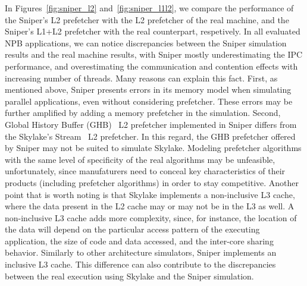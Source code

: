 \documentclass[AMA,final,STIX1COL]{WileyNJD-v2}
\begin{document}
In Figures~\ref{fig:sniper_l2} and~\ref{fig:sniper_l1l2}, we compare the performance of the Sniper's L2 prefetcher with the L2 prefetcher of the real machine, and the Sniper's L1+L2 prefetcher with the real counterpart, respetively.
In all evaluated NPB applications, we can notice discrepancies between the Sniper simulation results and the real machine results, with Sniper mostly underestimating the IPC performance, and overestimating the communication and contention effects with increasing number of threads.
Many reasons can explain this fact. 
First, as mentioned above, Sniper presents errors in its memory model when simulating parallel applications, even without considering prefetcher. 
These errors may be further amplified by adding a memory prefetcher in the simulation. 
Second, Global History Buffer (GHB)~\cite{nesbit2004data} L2 prefetcher implemented in Sniper differs from the Skylake's Stream~\cite{intelmanual} L2 prefetcher. 
In this regard, the GHB prefetcher offered by Sniper may not be suited to simulate Skylake. 
Modeling prefetcher algorithms with the same level of specificity of the real algorithms may be unfeasible, unfortunately, since manufaturers need to conceal key characteristics of their products (including prefetcher algorithms) in order to stay competitive.
Another point that is worth noting is that Skylake implements a non-inclusive L3 cache, where the data present in the L2 cache may or may not be in the L3 as well. 
A non-inclusive L3 cache adds more complexity, since, for instance, the location of the data will depend on the particular access pattern of the executing application, the size of code and data accessed, and the inter-core sharing behavior.
Similarly to other architecture simulators, Sniper implements an inclusive L3 cache. This difference can also contribute to the discrepancies between the real execution using Skylake and the Sniper simulation.

\end{document}

